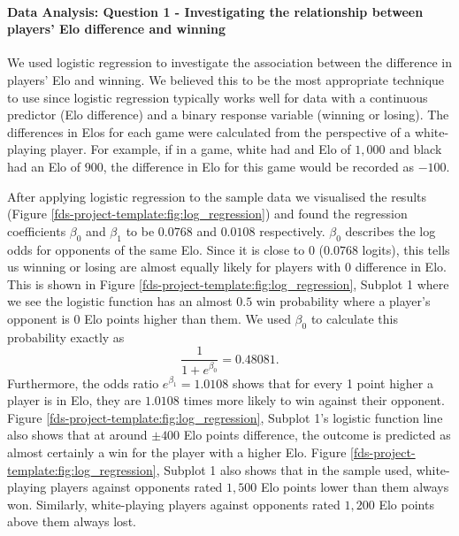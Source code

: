 \documentclass[10pt,a4paper]{article}
\begin{document}
\begin{multicols}{2}


\paragraph{Data Analysis: Question 1 - Investigating the relationship between players' Elo difference and winning}

We used logistic regression to investigate the association between the difference in players' Elo and winning. We believed this to be the most appropriate technique to use since logistic regression typically works well for data with a continuous predictor (Elo difference) and a binary response variable (winning or losing). The differences in Elos for each game were calculated from the perspective of a white-playing player. For example, if in a game, white had and Elo of $1,000$ and black had an Elo of $900$, the difference in Elo for this game would be recorded as $-100$. \newline

After applying logistic regression to the sample data we visualised the results (Figure \ref{fds-project-template:fig:log_regression}) and found the regression coefficients $\beta_{0}$ and $\beta_{1}$ to be $0.0768$ and $0.0108$ respectively. $\beta_{0}$ describes the log odds for opponents of the same Elo. Since it is close to $0$ ($0.0768$ logits), this tells us winning or losing are almost equally likely for players with $0$ difference in Elo. This is shown in Figure \ref{fds-project-template:fig:log_regression}, Subplot 1 where we see the logistic function has an almost $0.5$ win probability where a player's opponent is $0$ Elo points higher than them. We used $\beta_{0}$ to calculate this probability exactly as 
$$\displaystyle\frac{1}{1+e^{\beta_{0}}} = 0.48081.$$
Furthermore, the odds ratio $e^{\beta_{1}} = 1.0108$ shows that for every 1 point higher a player is in Elo, they are $1.0108$ times more likely to win against their opponent. Figure \ref{fds-project-template:fig:log_regression}, Subplot 1's logistic function line also shows that at around $\pm 400$ Elo points difference, the outcome is predicted as almost certainly a win for the player with a higher Elo. Figure \ref{fds-project-template:fig:log_regression}, Subplot 1 also shows that in the sample used, white-playing players against opponents rated $1,500$ Elo points lower than them always won. Similarly, white-playing players against opponents rated $1,200$ Elo points above them always lost. \newline


\end{multicols}
\end{document}
